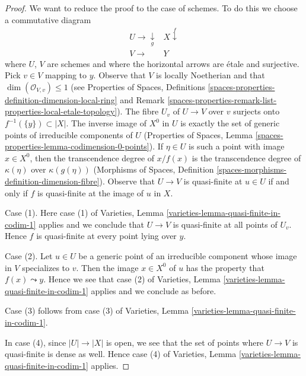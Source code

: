 \begin{proof}
We want to reduce the proof to the case of schemes. To do this we
choose a commutative diagram
$$
\begin{array}{cc}U \longrightarrow\underset{g}{\downarrow} & X \overset{f}{\downarrow} \\ V \longrightarrow & Y\end{array}
$$
where $U$, $V$ are schemes and where the horizontal arrows are \'etale
and surjective. Pick $v \in V$ mapping to $y$. Observe that
$V$ is locally Noetherian and that $\dim(\mathcal{O}_{V, v}) \leq 1$
(see Properties of Spaces, Definitions
\ref{spaces-properties-definition-dimension-local-ring} and
Remark \ref{spaces-properties-remark-list-properties-local-etale-topology}).
The fibre $U_v$ of $U \to V$ over $v$ surjects onto
$f^{-1}(\{y\}) \subset |X|$. The inverse image of $X^0$ in $U$
is exactly the set of
generic points of irreducible components of $U$ (Properties of Spaces, Lemma
\ref{spaces-properties-lemma-codimension-0-points}).
If $\eta \in U$ is such a point with image $x \in X^0$, then
the transcendence degree of $x / f(x)$ is the transcendence
degree of $\kappa(\eta)$ over $\kappa(g(\eta))$
(Morphisms of Spaces, Definition
\ref{spaces-morphisms-definition-dimension-fibre}).
Observe that $U \to V$ is quasi-finite at $u \in U$ if and only if
$f$ is quasi-finite at the image of $u$ in $X$.

\medskip\noindent
Case (1). Here case (1) of
Varieties, Lemma \ref{varieties-lemma-quasi-finite-in-codim-1} applies
and we conclude that $U \to V$ is quasi-finite at all points of $U_v$.
Hence $f$ is quasi-finite at every point lying over $y$.

\medskip\noindent
Case (2). Let $u \in U$ be a generic point of an irreducible component
whose image in $V$ specializes to $v$. Then the image $x \in X^0$ of
$u$ has the property that $f(x) \leadsto y$. Hence we see that
case (2) of
Varieties, Lemma \ref{varieties-lemma-quasi-finite-in-codim-1} applies
and we conclude as before.

\medskip\noindent
Case (3) follows from case (3) of
Varieties, Lemma \ref{varieties-lemma-quasi-finite-in-codim-1}.

\medskip\noindent
In case (4), since $|U| \to |X|$ is open, we see that
the set of points where $U \to V$ is quasi-finite is dense as well.
Hence case (4) of
Varieties, Lemma \ref{varieties-lemma-quasi-finite-in-codim-1} applies.
\end{proof}

